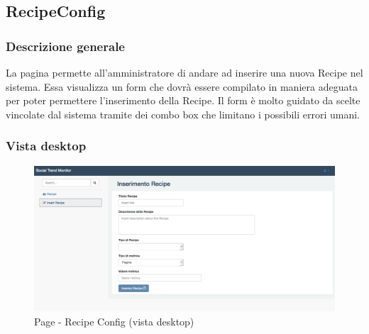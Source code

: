 	\subsection{RecipeConfig} %
	\label{sub:recipeconfig}
		\subsubsection{Descrizione generale} %
		La pagina permette all'amministratore di andare ad inserire una nuova Recipe nel sistema. Essa visualizza un form che dovrà essere compilato in maniera adeguata per poter permettere l'inserimento della Recipe. Il form è molto guidato da scelte vincolate dal sistema tramite dei combo box che limitano i possibili errori umani. 

		\subsubsection{Vista desktop} %
		\begin{figure}[htbp]
			\centering
			\centerline{\includegraphics[scale=0.4]{./images/mockup/recipe_config_vd.pdf}}
			\caption{Page - Recipe Config (vista desktop)}
		\end{figure}

